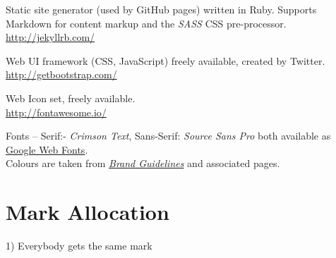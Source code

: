 \documentclass[a4paper, notoc]{tufte-handout}
\let\origdescription\description
\renewenvironment{description}{
  \setlength{\leftmargini}{1.5em}
  \origdescription
  \setlength{\itemindent}{-1.5em}
  \setlength{\labelsep}{\textwidth}
}
{\endlist}
\begin{document}
\begin{description}

\item[Jekyll]
Static site generator (used by GitHub pages) written in Ruby. Supports Markdown for 
content markup and the \textit{SASS} CSS pre-processor.
\\
\href{http://jekyllrb.com/}{http://jekyllrb.com/}

\item[BootStrap]
Web UI framework (CSS, JavaScript) freely available, created by Twitter.
\\
\href{http://getbootstrap.com/}{http://getbootstrap.com/}

\item[#FontAwesome]
Web Icon set, freely available.
\\
\href{http://fontawesome.io/}{http://fontawesome.io/}


\item[University of Edinburgh Style Guide]
Fonts -- Serif:- \textit{Crimson Text}, Sans-Serif: \textit{Source Sans Pro} both 
available as \href{https://fonts.google.com/}{Google Web Fonts}.
\\
Colours are taken from 
\href{http://www.ed.ac.uk/communications-marketing/resources}{\textit{Brand Guidelines}} 
and associated pages.
\\



\end{description}




\section*{Mark Allocation}



1) Everybody gets the same mark




%
%
\end{document}
